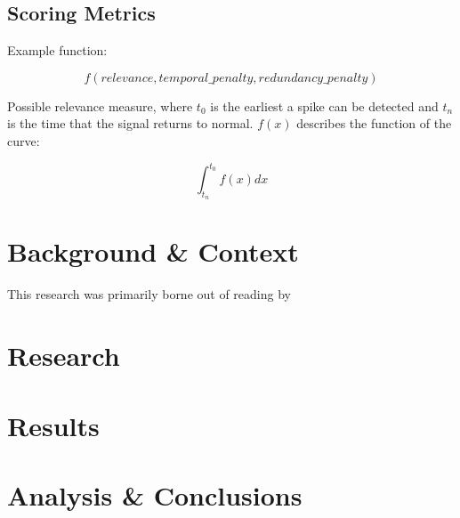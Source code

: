 \documentclass{uvamscse}	%
\begin{document}
\section{Scoring Metrics}

Example function:

\begin{equation}
	f(relevance, temporal\_penalty, redundancy\_penalty)
\end{equation}


Possible relevance measure, where $t_0$ is the earliest a spike can be detected and $t_n$ is the time that the signal returns to normal. $f(x)$ describes the function of the curve:

\begin{equation}
	\int^{t_0}_{t_n} f(x) dx
\end{equation}

\chapter{Background \& Context}

This research was primarily borne out of reading  by \citeauthor{Buntain2014}\cite{Buntain2014}

\chapter{Research}

\chapter{Results}

\chapter{Analysis \& Conclusions}


\printbibliography

\newpage

\end{document}
